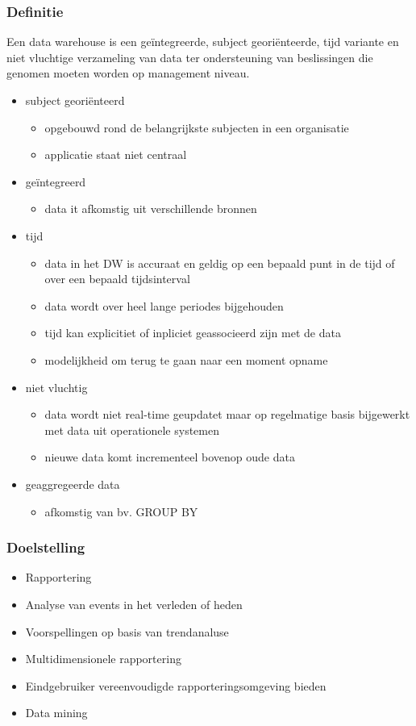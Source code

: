 \documentclass[a4paper,12pt]{article}
\begin{document}
\subsubsection{Definitie}
Een data warehouse is een geïntegreerde, subject georiënteerde, tijd variante en niet vluchtige verzameling van data ter ondersteuning van beslissingen die genomen moeten worden op management niveau.
\begin{itemize}
\item subject georiënteerd
	\begin{itemize}
	\item opgebouwd rond de belangrijkste subjecten in een organisatie
	\item applicatie staat niet centraal
	\end{itemize}
\item geïntegreerd
	\begin{itemize}
	\item data it afkomstig uit verschillende bronnen
	\end{itemize}
\item tijd
	\begin{itemize}
	\item data in het DW is accuraat en geldig op een bepaald punt in de tijd of over een bepaald tijdsinterval
	\item data wordt over heel lange periodes bijgehouden
	\item tijd kan explicitiet of inpliciet geassocieerd zijn met de data
	\item modelijkheid om terug te gaan naar een moment opname
	\end{itemize}
\item niet vluchtig
	\begin{itemize}
	\item data wordt niet real-time geupdatet maar op regelmatige basis bijgewerkt met data uit operationele systemen
	\item nieuwe data komt incrementeel bovenop oude data
	\end{itemize}
\item geaggregeerde data
	\begin{itemize}
	\item afkomstig van bv. GROUP BY
	\end{itemize}
\end{itemize}

\subsubsection{Doelstelling}
\begin{itemize}
\item Rapportering
\item Analyse van events in het verleden of heden
\item Voorspellingen op basis van trendanaluse
\item Multidimensionele rapportering
\item Eindgebruiker vereenvoudigde rapporteringsomgeving bieden
\item Data mining
\end{itemize}
\end{document}
